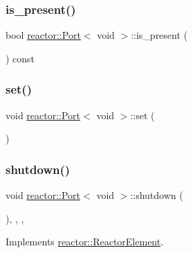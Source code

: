 \subsubsection{\texorpdfstring{is\+\_\+present()}{is\_present()}}
{\footnotesize\ttfamily bool \hyperlink{classreactor_1_1Port}{reactor\+::\+Port}$<$ void $>$\+::is\+\_\+present (\begin{DoxyParamCaption}{ }\end{DoxyParamCaption}) const}

\mbox{\label{classreactor_1_1Port_3_01void_01_4_afe579f1f5b555a15703c9a05d28bea03}} 
\subsubsection{\texorpdfstring{set()}{set()}}
{\footnotesize\ttfamily void \hyperlink{classreactor_1_1Port}{reactor\+::\+Port}$<$ void $>$\+::set (\begin{DoxyParamCaption}{ }\end{DoxyParamCaption})}

\mbox{\label{classreactor_1_1Port_3_01void_01_4_ad7d9028d091509215b3685e4af95cb03}} 
\subsubsection{\texorpdfstring{shutdown()}{shutdown()}}
{\footnotesize\ttfamily void \hyperlink{classreactor_1_1Port}{reactor\+::\+Port}$<$ void $>$\+::shutdown (\begin{DoxyParamCaption}{ }\end{DoxyParamCaption})\hspace{0.3cm}{\ttfamily [inline]}, {\ttfamily [final]}, {\ttfamily [override]}, {\ttfamily [virtual]}}



Implements \hyperlink{classreactor_1_1ReactorElement_a8fce084bef582156979ebba56737e907}{reactor\+::\+Reactor\+Element}.

\mbox{\label{classreactor_1_1Port_3_01void_01_4_a3a84b8d17b1a43197a753847b0df1777}} 

